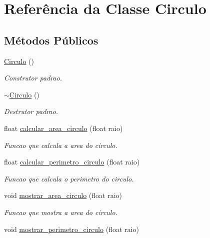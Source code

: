 \hypertarget{classCirculo}{}\section{Referência da Classe Circulo}
\label{classCirculo}
\subsection*{Métodos Públicos}
\begin{DoxyCompactItemize}
\item 
\mbox{\label{classCirculo_a6933bf908b78a4167684081a3a8f257f}} 
\hyperlink{classCirculo_a6933bf908b78a4167684081a3a8f257f}{Circulo} ()
\begin{DoxyCompactList}\small\item\em Construtor padrao. \end{DoxyCompactList}\item 
\mbox{\label{classCirculo_a8efe39e0e89487519cd802f0738d3bf4}} 
\hyperlink{classCirculo_a8efe39e0e89487519cd802f0738d3bf4}{$\sim$\+Circulo} ()
\begin{DoxyCompactList}\small\item\em Destrutor padrao. \end{DoxyCompactList}\item 
float \hyperlink{classCirculo_a8b1dcd969c061e1ced2fc8a09995baf1}{calcular\+\_\+area\+\_\+circulo} (float raio)
\begin{DoxyCompactList}\small\item\em Funcao que calcula a area do circulo. \end{DoxyCompactList}\item 
float \hyperlink{classCirculo_a7a252b9ffe65913908a1da8720290239}{calcular\+\_\+perimetro\+\_\+circulo} (float raio)
\begin{DoxyCompactList}\small\item\em Funcao que calcula o perimetro do circulo. \end{DoxyCompactList}\item 
void \hyperlink{classCirculo_a2ed2db29db9ed4e1888c3c2546a80dbe}{mostrar\+\_\+area\+\_\+circulo} (float raio)
\begin{DoxyCompactList}\small\item\em Funcao que mostra a area do circulo. \end{DoxyCompactList}\item 
void \hyperlink{classCirculo_ac5a5f03cc0940179a9684129361c76ba}{mostrar\+\_\+perimetro\+\_\+circulo} (float raio)

\end{DoxyCompactItemize}
